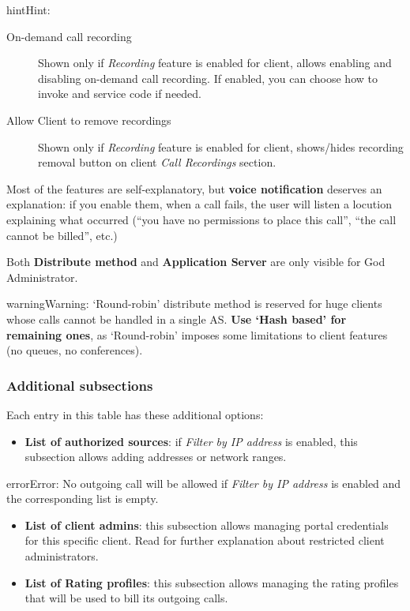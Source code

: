 \documentclass[letterpaper,10pt,english]{sphinxmanual}
\begin{document}
\begin{notice}{hint}{Hint:}
\begin{description}
\item[{On-demand call recording}] \leavevmode
Shown only if \emph{Recording} feature is enabled for client, allows enabling and
disabling on-demand call recording. If enabled, you can choose how to invoke
and service code if needed.

\item[{Allow Client to remove recordings}] \leavevmode
Shown only if \emph{Recording} feature is enabled for client, shows/hides recording
removal button on client \emph{Call Recordings} section.

\end{description}
\end{notice}

Most of the features are self-explanatory, but \textbf{voice notification} deserves
an explanation: if you enable them, when a call fails, the user will listen a
locution explaining what occurred (``you have no permissions to place this call'',
``the call cannot be billed'', etc.)

Both \textbf{Distribute method} and \textbf{Application Server} are only visible for God
Administrator.

\begin{notice}{warning}{Warning:}
`Round-robin' distribute method is reserved for huge clients
whose calls cannot be handled in a single AS. \textbf{Use `Hash based'
for remaining ones}, as `Round-robin' imposes some limitations
to client features (no queues, no conferences).
\end{notice}


\subsubsection{Additional subsections}
\label{administration_portal/brand/clients/virtual_pbx:additional-subsections}
Each entry in this table has these additional options:
\begin{itemize}
\item {} 
\textbf{List of authorized sources}: if \emph{Filter by IP address} is enabled, this subsection allows adding addresses or network ranges.

\end{itemize}

\begin{notice}{error}{Error:}
No outgoing call will be allowed if \emph{Filter by IP address} is enabled and the corresponding list is empty.
\end{notice}
\begin{itemize}
\item {} 
\textbf{List of client admins}: this subsection allows managing portal credentials for this specific client. Read {\hyperref[api_rest/acls:acls]{}}
for further explanation about restricted client administrators.

\item {} 
\textbf{List of Rating profiles}: this subsection allows managing the rating profiles that will be used to bill its outgoing calls.

\end{itemize}
\end{document}
